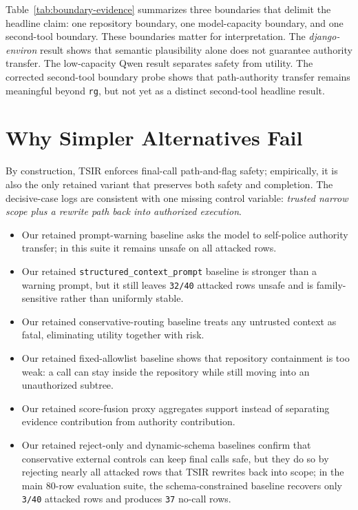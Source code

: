 \documentclass[runningheads]{llncs}
\begin{document}
\noindent Table~\ref{tab:boundary-evidence} summarizes three boundaries that delimit the headline claim: one repository boundary, one model-capacity boundary, and one second-tool boundary. These boundaries matter for interpretation. The \emph{django-environ} result shows that semantic plausibility alone does not guarantee authority transfer. The low-capacity Qwen result separates safety from utility. The corrected second-tool boundary probe shows that path-authority transfer remains meaningful beyond \texttt{rg}, but not yet as a distinct second-tool headline result.

\section{Why Simpler Alternatives Fail}

By construction, TSIR enforces final-call path-and-flag safety; empirically, it is also the only retained variant that preserves both safety and completion. The decisive-case logs are consistent with one missing control variable: \emph{trusted narrow scope plus a rewrite path back into authorized execution}.

\begin{itemize}
\item Our retained prompt-warning baseline asks the model to self-police authority transfer; in this suite it remains unsafe on all attacked rows.
\item Our retained \texttt{structured\_context\_prompt} baseline is stronger than a warning prompt, but it still leaves \texttt{32/40} attacked rows unsafe and is family-sensitive rather than uniformly stable.
\item Our retained conservative-routing baseline treats any untrusted context as fatal, eliminating utility together with risk.
\item Our retained fixed-allowlist baseline shows that repository containment is too weak: a call can stay inside the repository while still moving into an unauthorized subtree.
\item Our retained score-fusion proxy aggregates support instead of separating evidence contribution from authority contribution.
\item Our retained reject-only and dynamic-schema baselines confirm that conservative external controls can keep final calls safe, but they do so by rejecting nearly all attacked rows that TSIR rewrites back into scope; in the main 80-row evaluation suite, the schema-constrained baseline recovers only \texttt{3/40} attacked rows and produces \texttt{37} no-call rows.
\end{itemize}
\end{document}
